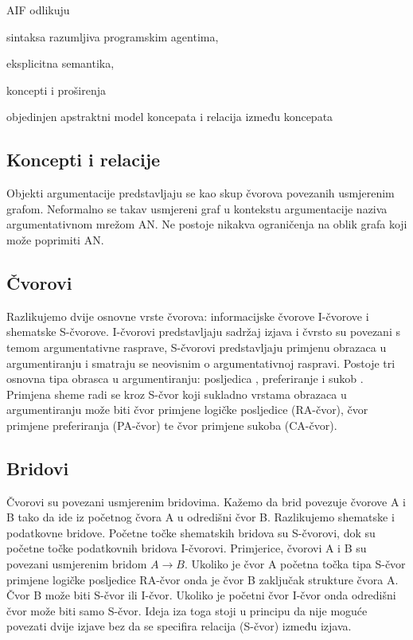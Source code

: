 AIF odlikuju 
\begin{enumerate*}
    \item sintaksa razumljiva programskim agentima,
    \item eksplicitna semantika,
    \item koncepti i proširenja 
    \item objedinjen apstraktni model koncepata i relacija između
koncepata
\end{enumerate*}

\subsection{Koncepti i relacije}

Objekti argumentacije predstavljaju se kao skup čvorova povezanih usmjerenim grafom. 
Neformalno se takav usmjereni graf u kontekstu argumentacije naziva
argumentativnom mrežom  AN\@. Ne 
postoje nikakva ograničenja na oblik grafa koji može poprimiti AN.

\subsection{Čvorovi}

Razlikujemo dvije osnovne vrste čvorova: informacijske čvorove
 I-čvorove i shematske  S-čvorove.
I-čvorovi predstavljaju sadržaj izjava i čvrsto su povezani s temom
argumentativne rasprave, S-čvorovi predstavljaju primjenu obrazaca u
argumentiranju i smatraju se neovisnim o argumentativnoj raspravi. Postoje tri
osnovna tipa obrasca u argumentiranju: posljedica ,
preferiranje  i sukob . Primjena sheme
radi se kroz S-čvor koji sukladno vrstama obrazaca u argumentiranju može biti
čvor primjene logičke posljedice  (RA-čvor), 
čvor primjene preferiranja  (PA-čvor) te
čvor primjene sukoba  (CA-čvor).

\subsection{Bridovi}

Čvorovi su povezani usmjerenim bridovima. Kažemo da brid povezuje čvorove A i B
tako da ide iz početnog čvora A u odredišni čvor B. Razlikujemo shematske i podatkovne
bridove. Početne točke shematskih bridova su S-čvorovi, dok su početne točke 
podatkovnih bridova I-čvorovi. Primjerice, čvorovi A i B su povezani usmjerenim bridom 
$A \rightarrow B$. Ukoliko je čvor A početna točka tipa
S-čvor primjene logičke posljedice RA-čvor onda je čvor B zaključak strukture
čvora A. Čvor B može biti S-čvor ili I-čvor. Ukoliko je početni čvor I-čvor onda
odredišni čvor može biti samo S-čvor. 
Ideja iza toga stoji u principu da nije moguće povezati dvije izjave bez da se
specifira relacija (S-čvor) između izjava. 

